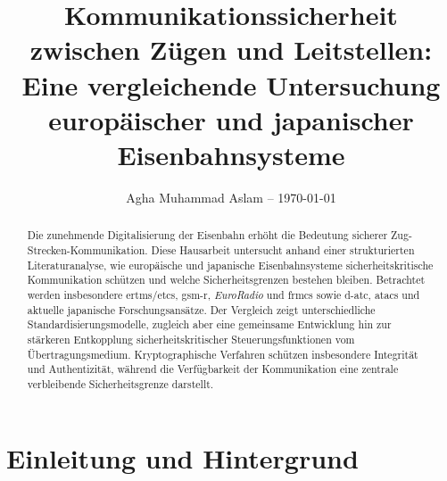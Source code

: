 \documentclass[runningheads]{res/llncs}
\begin{document}
\glsunsetall


\title{Kommunikationssicherheit zwischen Zügen und Leitstellen: Eine vergleichende Untersuchung europäischer und japanischer Eisenbahnsysteme}


\author{Agha Muhammad Aslam -- \today}



\maketitle

\begin{abstract}
Die zunehmende Digitalisierung der Eisenbahn erhöht die Bedeutung sicherer Zug-Strecken-Kommunikation. Diese Hausarbeit untersucht anhand einer strukturierten Literaturanalyse, wie europäische und japanische Eisenbahnsysteme sicherheitskritische Kommunikation schützen und welche Sicherheitsgrenzen bestehen bleiben. Betrachtet werden insbesondere \gls{ertms}/\gls{etcs}, \gls{gsm-r}, \textit{EuroRadio} und \gls{frmcs} sowie \gls{d-atc}, \gls{atacs} und aktuelle japanische Forschungsansätze. Der Vergleich zeigt unterschiedliche Standardisierungsmodelle, zugleich aber eine gemeinsame Entwicklung hin zur stärkeren Entkopplung sicherheitskritischer Steuerungsfunktionen vom Übertragungsmedium. Kryptographische Verfahren schützen insbesondere Integrität und Authentizität, während die Verfügbarkeit der Kommunikation eine zentrale verbleibende Sicherheitsgrenze darstellt.

\end{abstract}

\section{Einleitung und Hintergrund}
\label{sec:Einleitung_und_Hintergrund}
\end{document}
